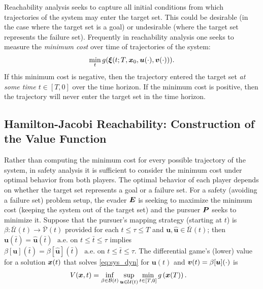 Reachability analysis seeks to capture all initial conditions from which trajectories of the system may enter the target set.  This could be desirable (in the case where the target set is a goal) or undesirable (where the target set represents the failure set). Frequently in reachability analysis one seeks to measure the \textit{minimum cost} over time of trajectories of the system:
\begin{align}
	\min_t g(\bm{\xi}(t; T, \bm{x}_0, \bm{u}(\cdot), \bm{v}(\cdot))).
\end{align}
If this minimum cost is negative, then the trajectory entered the target set \textit{at some time $t\in[T,0]$} over the time horizon. If the minimum cost is positive, then the trajectory will never enter the target set in the time horizon. 

\subsection{Hamilton-Jacobi Reachability:  Construction of the Value Function}
Rather than computing the minimum cost for every possible trajectory of the system, in safety analysis it is sufficient to consider the minimum cost under optimal behavior from both players.  The optimal behavior of each player depends on whether the target set represents a goal or a failure set. For a safety (avoiding a failure set) problem setup, the evader $\bm{E}$ is seeking to maximize the minimum cost (keeping the system out of the target set) and the pursuer $\bm{P}$ seeks to minimize it. 
Suppose that the pursuer's mapping strategy (starting at $t$) is $\beta: \mathcal{\bar{U}}({t}) \rightarrow \mathcal{\bar{V}}({t})$ provided for each $t \le \tau \le T$ and $\bm{u}, \hat{\bm{u}} \in \mathcal{\bar{U}}({t})$; then $\bm{u}(\bar{t}) = \hat{\bm{u}}(\bar{t}) \,\, \text{ a.e. on } t \le \bar{t}  \le \tau$ implies $\beta[\bm{u}](\bar{t}) = \beta[\hat{\bm{u}}](\bar{t}) \,\, \text{ a.e. on } t \le \bar{t}  \le \tau$.
%
The differential game's (lower) value for a solution $\bm{x}(t)$ that solves \eqref{eq:sys_dyn} for $\bm{u}(t)$ and $\bm{v}(t) = \beta[\bm{u}](\cdot)$ is 
%
\begin{align}
	&V(\state, t) = %
	\inf_{\beta \in \mathcal{B}(t)} \sup_{\bm{u} \in \mathcal{U}(t)} %
	\min_{t\in[T,0]}
	g\left(\bm{x}(T)\right). %
	\label{eq:value_lower}
\end{align}

